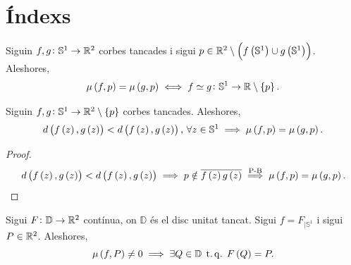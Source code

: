 \section{Índexs}

\begin{teo*}
	Siguin $f, g \colon \mathbb{S}^1 \to \mathbb{R} ^2$ corbes tancades i sigui $p\in \mathbb{R}^2 \setminus \left( f\left( \mathbb{S}^1\right) \cup g\left( \mathbb{S}^1\right)\right)$. Aleshores,
	\[
		\mu \left( f, p\right) = \mu\left( g, p \right) \iff f \simeq g  \colon \mathbb{S}^1 \to \mathbb{R} \setminus \left\{ p \right\}.
	\]
\end{teo*}

\begin{teo*}[Rouché]
	Siguin $f, g \colon \mathbb{S}^1 \to \mathbb{R} ^2 \setminus \left\{ p \right\}$ corbes tancades. Aleshores,
	\[
		d \left( f \left( z \right), g \left( z \right) \right) < d \left( f \left( z \right), g \left( z \right) \right), \, \forall z\in \mathbb{S}^1 \implies \mu \left( f, p\right) = \mu\left( g, p \right).
	\]

\end{teo*}
\begin{proof}
	\[
		d \left( f \left( z \right), g \left( z \right) \right) < d \left( f \left( z \right), g \left( z \right) \right) \implies p \notin \overline{f\left( z \right) g \left( z \right)} \stackrel{\text{P-B}}{\implies} \mu \left( f, p\right) = \mu\left( g, p \right).
	\]
\end{proof}
\begin{teo*}
	Sigui $F\colon \mathbb{D} \to \mathbb{R} ^2$ contínua, on $\mathbb{D}$ és el disc unitat tancat. Sigui $f=F_{|\mathbb{S}^1}$ i sigui $P \in \mathbb{R} ^2$. Aleshores,
	\[
		\mu\left( f, P \right) \neq 0 \implies \exists Q \in \mathbb{D} \operatorname{\;t.q.\;} F\left( Q \right) = P.
	\]
\end{teo*}

